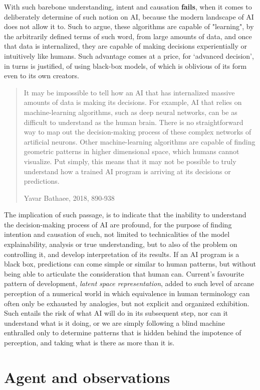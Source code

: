 With such barebone understanding, intent and causation \textbf{fails}, when it comes to deliberately determine of such notion on AI, because the modern landscape of AI does not allow it to. Such to argue, these algorithms are capable of "learning", by the arbitrarily defined terms of such word, from large amounts of data, and once that data is internalized, they are capable of making decisions experientially or intuitively like humans. Such advantage comes at a price, for `advanced decision', in turns is justified, of using black-box models, of which is oblivious of its form even to its own creators. 
\blockquote[Yavar Bathaee, 2018, 890-938]{It may be impossible to tell how an AI that has internalized massive amounts of data is making its decisions. For example, AI that relies on machine-learning algorithms, such as deep neural networks, can be as difficult to understand as the human brain. There is no straightforward way to map out the decision-making process of these complex networks of artificial neurons. Other machine-learning algorithms are capable of finding geometric patterns in higher dimensional space, which humans cannot visualize. Put simply, this means that it may not be possible to truly understand how a trained AI program is arriving at its decisions or predictions.}
The implication of such passage, is to indicate that the inability to understand the decision-making process of AI are profound, for the purpose of finding intention and causation of such, not limited to technicalities of the model explainability, analysis or true understanding, but to also of the problem on controlling it, and develop interpretation of its results. If an AI program is a black box, predictions can come simple or similar to human patterns, but without being able to articulate the consideration that human can. Current's favourite pattern of development, \textit{latent space representation}, added to such level of arcane perception of a numerical world in which equivalence in human terminology can often only be exhausted by analogies, but not explicit and organized exhibition. Such entails the risk of what AI will do in its subsequent step, nor can it understand what is it doing, or we are simply following a blind machine enthralled only to determine patterns that is hidden behind the impotence of perception, and taking what is there as more than it is. 

\section{Agent and observations}

